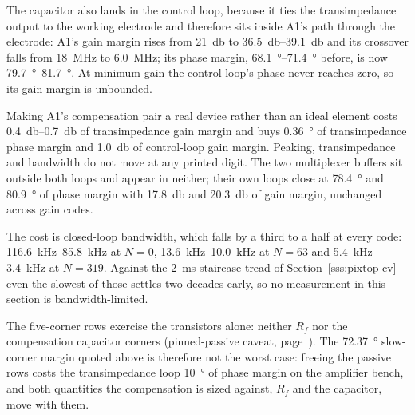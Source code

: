 The capacitor also lands in the control loop, because it ties the
transimpedance output to the working electrode and therefore sits inside A1's
path through the electrode: A1's gain margin rises from \SI{21}{\decibel} to
\SIrange{36.5}{39.1}{\decibel} and its crossover falls from \SI{18}{\mega\hertz}
to \SI{6.0}{\mega\hertz}; its phase margin, \SIrange{68.1}{71.4}{\degree}
before, is now \SIrange{79.7}{81.7}{\degree}. At minimum gain
the control loop's phase never reaches zero, so its gain margin is unbounded.

Making A1's compensation pair a real device rather than an ideal element costs
\SIrange{0.4}{0.7}{\decibel} of transimpedance gain margin and buys
\SI{0.36}{\degree} of transimpedance phase margin and \SI{1.0}{\decibel} of
control-loop gain margin. Peaking, transimpedance and bandwidth do not move at
any printed digit. The two multiplexer buffers sit outside both loops and
appear in neither; their own loops close at \SI{78.4}{\degree} and
\SI{80.9}{\degree} of phase margin with \SI{17.8}{\decibel} and
\SI{20.3}{\decibel} of gain margin, unchanged across gain codes.

The cost is closed-loop bandwidth, which falls by a third to a half at every
code: \SIrange{116.6}{85.8}{\kilo\hertz} at \(N = 0\),
\SIrange{13.6}{10.0}{\kilo\hertz} at \(N = 63\) and
\SIrange{5.4}{3.4}{\kilo\hertz} at \(N = 319\). Against the
\SI{2}{\milli\second} staircase tread of Section~\ref{sss:pixtop-cv} even the
slowest of those settles two decades early, so no measurement in this section
is bandwidth-limited.

The five-corner rows exercise the transistors alone: neither \(R_f\) nor the
compensation capacitor corners (pinned-passive caveat,
page~\pageref{p:pinned-passives}). The \SI{72.37}{\degree} slow-corner margin
quoted above is therefore not the worst case: freeing the passive rows costs
the transimpedance loop \SI{10}{\degree} of phase margin on the amplifier bench,
and both quantities the compensation is sized against, \(R_f\) and the
capacitor, move with them.
